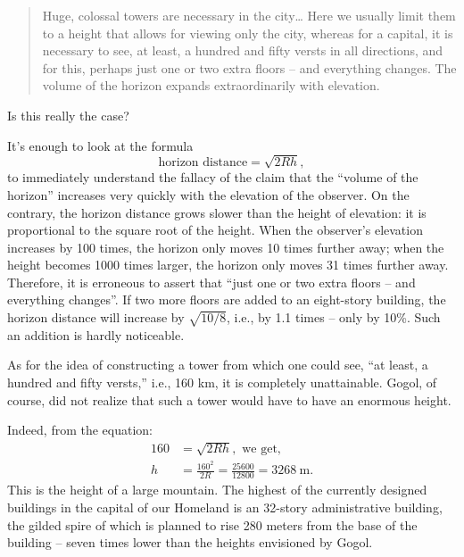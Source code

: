 \begin{quote}
Huge, colossal towers are necessary in the city\dots{} Here we usually limit them to a height that allows for viewing only the city, whereas for a capital, it is necessary to see, at least, a hundred and fifty versts in all directions, and for this, perhaps just one or two extra floors -- and everything changes. The volume of the horizon expands extraordinarily with elevation.
\end{quote}

Is this really the case?

\ans It's enough to look at the formula 
\begin{equation*}%
\text{horizon distance} = \sqrt{2Rh}, 
\end{equation*}
to immediately understand the fallacy of the claim that the ``volume of the horizon'' increases very quickly with the elevation of the observer. On the contrary, the horizon distance grows slower than the height of elevation: it is proportional to the square root of the height. When the observer's elevation increases by 100 times, the horizon only moves 10 times further away; when the height becomes 1000 times larger, the horizon only moves 31 times further away. Therefore, it is erroneous to assert that ``just one or two extra floors -- and everything changes''. If two more floors are added to an eight-story building, the horizon distance will increase by $\sqrt{10/8}$, i.e., by 1.1 times -- only by 10\%. Such an addition is hardly noticeable.

As for the idea of constructing a tower from which one could see, ``at least, a hundred and fifty versts,'' i.e., 160 km, it is completely unattainable. Gogol, of course, did not realize that such a tower would have to have an enormous height.

Indeed, from the equation:
\begin{align*}%
160 & = \sqrt{2Rh}, \,\, \text{we get,}\\
h & = \frac{160^{2}}{2R}  = \frac{25600}{12800} = \SI{3268}{\meter}.
\end{align*}
This is the height of a large mountain. The highest of the currently designed buildings in the capital of our Homeland is an 32-story administrative building, the gilded spire of which is planned to rise 280 meters from the base of the building -- seven times lower than the heights envisioned by Gogol. 


